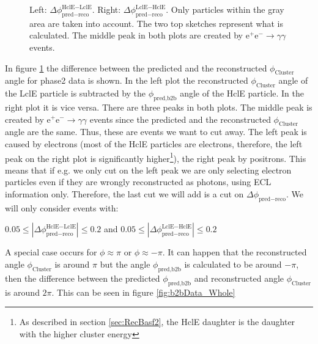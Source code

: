 \documentclass[a4paper,11pt,twosided,final,german,openbib,pdftex,listof=totoc,bibliography=totoc]{scrbook}
\begin{document}
\begin{figure}[h!]
\begin{minipage}[b]{\textwidth}
	\caption[b2bClusterPhi - clusterPhi For Phase2 Data]{Left: $\Delta \phi _{\textrm{pred} - \textrm{reco}}^{\textrm{HclE}-\textrm{LclE}}$. Right:  $\Delta \phi _{\textrm{pred} - \textrm{reco}}^{\textrm{LclE}-\textrm{HclE}}$. Only particles within the gray area are taken into account. The two top sketches represent what is calculated. The middle peak in both plots are created by $\textrm{e}^+\textrm{e}^- \rightarrow \gamma \gamma$ events.}
	\label{fig:b2bData}

\end{minipage}
\end{figure}


In figure \ref{fig:b2bData} the difference between the predicted and the reconstructed $\phi_{\textrm{Cluster}}$ angle for phase2 data is shown. In the left plot the reconstructed $\phi_{\textrm{Cluster}}$ angle of the LclE particle is subtracted by the  $\phi_{\textrm{pred,b2b}}$  angle of the HclE particle. In the right plot it is vice versa. There are three peaks in both plots. The middle peak is created by $\textrm{e}^+ \textrm{e}^- \rightarrow \gamma \gamma$ events since the predicted and the reconstructed $\phi_{\textrm{Cluster}}$ angle are the same. Thus, these are events we want to cut away. The left peak is caused by electrons (most of the HclE particles are electrons, therefore, the left peak on the right plot is significantly higher\footnote{As described in section \ref{sec:RecBasf2}, the HclE daughter is the daughter with the higher cluster energy}), the right peak by positrons. This means that if e.g. we only cut on the left peak we are only selecting electron particles even if they are wrongly reconstructed as photons, using ECL information only. 
Therefore, the last cut we will add is a cut on $\Delta \phi _{\textrm{pred} - \textrm{reco}}$. We will only consider events with:
\newline













 $0.05 \leq |\Delta \phi _{\textrm{pred} - \textrm{reco}}^{\textrm{HclE}-\textrm{LclE}}| \leq 0.2 $ and  $0.05 \leq |\Delta \phi _{\textrm{pred} - \textrm{reco}}^{\textrm{LclE}-\textrm{HclE}}| \leq 0.2$
\newline


A special case occurs for $\phi \approx \pi$ or $\phi \approx -\pi$. It can happen that the reconstructed angle $\phi_{\textrm{Cluster}}$ is around $\pi$ but the angle $\phi_{\textrm{pred,b2b}}$ is calculated to be around $-\pi$, then the difference between the predicted $\phi_{\textrm{pred,b2b}}$ and reconstructed angle $\phi_{\textrm{Cluster}}$ is around $2\pi$. This can be seen in figure \ref{fig:b2bData_Whole}
\end{document}
